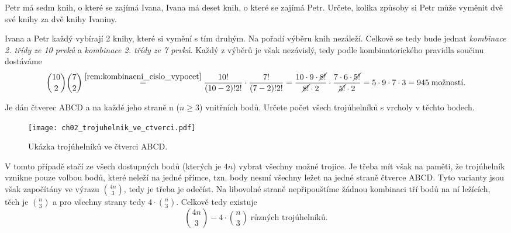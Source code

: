 \begin{task}
    Petr má sedm knih, o které se zajímá Ivana, Ivana má deset knih, o které se zajímá Petr. Určete, kolika způsoby si Petr může vyměnit dvě své knihy za dvě knihy Ivaniny. \citep[sekce \emph{Kombinace}]{Farska2007}
\end{task}
\begin{solution}
    Ivana a Petr každý vybírají 2 knihy, které si vymění s tím druhým. Na pořadí výběru knih nezáleží. Celkově se tedy bude jednat \emph{kombinace 2. třídy ze 10 prvků} a \emph{kombinace 2. třídy ze 7 prvků}. Každý z výběrů je však nezávislý, tedy podle kombinatorického pravidla součinu dostáváme
    \[\binom{10}{2}\binom{7}{2}\stackrel{\ref{rem:kombinacni_cislo_vypocet}}{=}\dfrac{10!}{(10-2)!2!}\cdot\dfrac{7!}{(7-2)!2!}=\dfrac{10\cdot 9\cdot \cancel{8!}}{\cancel{8!}\cdot 2}\cdot\dfrac{7\cdot 6\cdot\cancel{5!}}{\cancel{5!}\cdot 2}=5\cdot 9\cdot 7\cdot 3=945\;\text{možností.}\]
\end{solution}

\begin{task}
    Je dán čtverec ABCD a na každé jeho straně n ($n\geqslant 3$) vnitřních bodů. Určete počet všech trojúhelníků s vrcholy v těchto bodech. \citep[sekce \emph{Kombinace}]{Farska2007}
\end{task}
\begin{figure}[H]
	\centering
	\texttt{[image: ch02\_trojuhelnik\_ve\_ctverci.pdf]}
    \caption{Ukázka trojúhelníků ve čtverci ABCD.}
    \label{fig:trojuhelniky_ve_ctverci}
\end{figure}
\begin{solution}
    V tomto případě stačí ze všech dostupných bodů (kterých je $4n$) vybrat všechny možné trojice. Je třeba mít však na paměti, že trojúhelník vznikne pouze volbou bodů, které neleží na jedné přímce, tzn. body nesmí všechny ležet na jedné straně čtverce ABCD. Tyto varianty jsou však započítány ve výrazu $\binom{4n}{3}$, tedy je třeba je odečíst. Na libovolné straně nepřipouštíme žádnou kombinaci tří bodů na ní ležících, těch je $\binom{n}{3}$ a pro všechny strany tedy $4\cdot \binom{n}{3}$. Celkově tedy existuje
    \[\binom{4n}{3}-4\cdot\binom{n}{3}\;\text{různých trojúhelníků.}\]
\end{solution}

